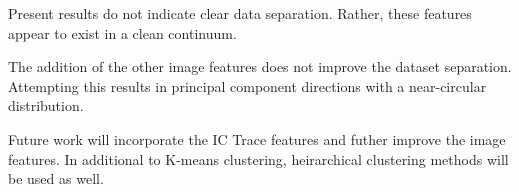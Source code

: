 \documentclass[11pt]{article}
\begin{document}
Present results do not indicate clear data separation.
Rather, these features appear to exist in a clean continuum.

The addition of the other image features does not improve the dataset separation.
Attempting this results in principal component directions with a near-circular distribution.

Future work will incorporate the IC Trace features and futher improve the image features.
In additional to K-means clustering, heirarchical clustering methods will be used as well.



\printbibliography
\end{document}
